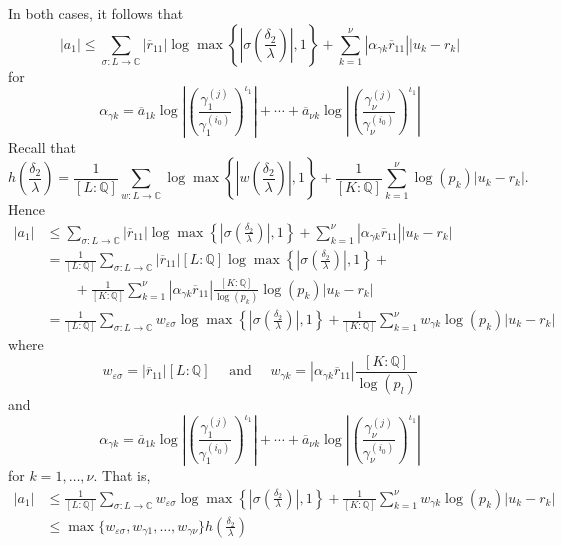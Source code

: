 In both cases, it follows that
\[|a_1| \leq \sum_{\sigma: L \to \mathbb{C}}|\overline{r}_{11}|\log\max \left\{\left|\sigma \left(\frac{\delta_2}{\lambda}\right)\right|,1\right\} + \sum_{k=1}^{\nu}|\alpha_{\gamma k}\overline{r}_{11}||u_k-r_k|\]
for 
\[\alpha_{\gamma k} = \overline{a}_{1k}\log\left| \left( \frac{\gamma_1^{(j)}}{\gamma_1^{(i_0)}}\right)^{\iota_1}\right| + \cdots + \overline{a}_{\nu k}\log\left| \left( \frac{\gamma_{\nu}^{(j)}}{\gamma_{\nu}^{(i_0)}}\right)^{\iota_1}\right|\]
Recall that
\[h\left(\frac{\delta_2}{\lambda}\right) = \frac{1}{[L:\mathbb{Q}]}\sum_{w :L \to \mathbb{C}} \log \max \left\{ \left|w\left(\frac{\delta_2}{\lambda}\right)\right|, 1\right\} + \frac{1}{[K:\mathbb{Q}]}\sum_{k = 1}^{\nu} \log(p_k)|u_k - r_k|.\]
Hence
\begin{align*}
|a_1|	& \leq \sum_{\sigma: L \to \mathbb{C}}|\overline{r}_{11}|\log\max \left\{\left|\sigma \left(\frac{\delta_2}{\lambda}\right)\right|,1\right\} + \sum_{k=1}^{\nu}|\alpha_{\gamma k}\overline{r}_{11}||u_k-r_k|\\
	& = \frac{1}{[L:\mathbb{Q}]}\sum_{\sigma: L \to \mathbb{C}}|\overline{r}_{11}|[L:\mathbb{Q}]\log\max \left\{\left|\sigma \left(\frac{\delta_2}{\lambda}\right)\right|,1\right\} + \\
	& \quad \quad + \frac{1}{[K:\mathbb{Q}]}\sum_{k=1}^{\nu}|\alpha_{\gamma k}\overline{r}_{11}|\frac{[K:\mathbb{Q}]}{\log(p_k)}\log(p_k)|u_k-r_k|\\
	& = \frac{1}{[L:\mathbb{Q}]}\sum_{\sigma :L \to \mathbb{C}} w_{\varepsilon \sigma}\log \max \left\{ \left|\sigma\left(\frac{\delta_2}{\lambda}\right)\right|, 1\right\} + \frac{1}{[K:\mathbb{Q}]}\sum_{k= 1}^{\nu} w_{\gamma k}\log(p_k)|u_k - r_k|
\end{align*}
where
\[w_{\varepsilon \sigma} = |\overline{r}_{11}|[L:\mathbb{Q}] \quad \text{ and } \quad 
	w_{\gamma k} = |\alpha_{\gamma k}\overline{r}_{11}|\frac{[K:\mathbb{Q}]}{\log(p_l)}\]
and
\[\alpha_{\gamma k} = \overline{a}_{1k}\log\left| \left( \frac{\gamma_1^{(j)}}{\gamma_1^{(i_0)}}\right)^{\iota_1}\right| + \cdots + \overline{a}_{\nu k}\log\left| \left( \frac{\gamma_{\nu}^{(j)}}{\gamma_{\nu}^{(i_0)}}\right)^{\iota_1}\right|\]
for $k = 1, \dots, \nu$. That is, 
\begin{align*}
|a_1|	& \leq \frac{1}{[L:\mathbb{Q}]}\sum_{\sigma :L \to \mathbb{C}} w_{\varepsilon \sigma}\log \max \left\{ \left|\sigma\left(\frac{\delta_2}{\lambda}\right)\right|, 1\right\} + \frac{1}{[K:\mathbb{Q}]}\sum_{k = 1}^{\nu} w_{\gamma k}\log(p_k)|u_k - r_k|\\
	& \leq \max\{w_{\varepsilon \sigma}, w_{\gamma 1}, \dots, w_{\gamma \nu}\} h\left(\frac{\delta_2}{\lambda}\right)
\end{align*}

